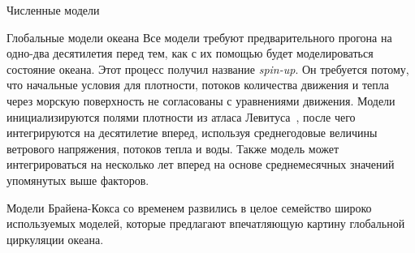 \begin{chapter}{Численные модели}
\begin{section}{Глобальные модели океана}
Все модели требуют предварительного прогона на одно-два десятилетия перед
тем, как с их помощью будет моделироваться состояние океана. Этот процесс
получил название \emph{spin-up}.
Он требуется потому, что начальные условия для плотности, потоков количества
движения и тепла через морскую поверхность не согласованы с уравнениями
движения. Модели инициализируются полями плотности из атласа 
Левитуса~\cite{Levitus:1982}, после чего интегрируются на десятилетие вперед,
используя среднегодовые величины ветрового 
напряжения, потоков 
тепла и воды. Также модель может интегрироваться на 
несколько лет вперед на основе среднемесячных значений упомянутых выше 
факторов.
%

Модели Брайена-Кокса со временем
развились в целое семейство широко используемых моделей, которые предлагают
впечатляющую картину глобальной циркуляции океана.
%


\end{section}
\end{chapter}

